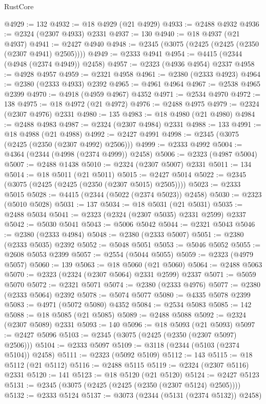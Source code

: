 \begin{lexlean}{RustCore}
\begin{coremodule}
@4929 := 132
@4932 := @18 @4929 (@21 @4929)
@4933 := @2488 @4932
@4936 := @2324 (@2307 @4933) @2331
@4937 := 130
@4940 := @18 @4937 (@21 @4937)
@4941 := @2427 @4940
@4948 := @2345 (@3075 (@2425 (@2425 (@2350 (@2307 @4941) @2505))))
@4949 := @2333 @4941
@4954 := @4415 (@2344 (@4948 (@2374 @4949)) @2458)
@4957 := @2323 (@4936 @4954) @2337
@4958 := @4928 @4957
@4959 := @2321 @4958
@4961 := @2380 (@2333 @4923)
@4964 := @2380 (@2333 @4933) @2392
@4965 := @4961 @4964
@4967 := @2538 @4965 @2399
@4970 := @4918 (@4959 @4967) @4352
@4971 := @2534 @4970
@4972 := 138
@4975 := @18 @4972 (@21 @4972)
@4976 := @2488 @4975
@4979 := @2324 (@2307 @4976) @2331
@4980 := 135
@4983 := @18 @4980 (@21 @4980)
@4984 := @2488 @4983
@4987 := @2324 (@2307 @4984) @2331
@4988 := 133
@4991 := @18 @4988 (@21 @4988)
@4992 := @2427 @4991
@4998 := @2345 (@3075 (@2425 (@2350 (@2307 @4992) @2506)))
@4999 := @2333 @4992
@5004 := @4364 (@2344 (@4998 (@2374 @4999)) @2458)
@5006 := @2323 (@4987 @5004)
@5007 := @2488 @1438
@5010 := @2324 (@2307 @5007) @2331
@5011 := 134
@5014 := @18 @5011 (@21 @5011)
@5015 := @2427 @5014
@5022 := @2345 (@3075 (@2425 (@2425 (@2350 (@2307 @5015) @2505))))
@5023 := @2333 @5015
@5028 := @4415 (@2344 (@5022 (@2374 @5023)) @2458)
@5030 := @2323 (@5010 @5028)
@5031 := 137
@5034 := @18 @5031 (@21 @5031)
@5035 := @2488 @5034
@5041 := @2323 (@2324 (@2307 @5035) @2331 @2599) @2337
@5042 := @5030 @5041
@5043 := @5006 @5042
@5044 := @2321 @5043
@5046 := @2380 (@2333 @4984)
@5048 := @2380 (@2333 @5007)
@5051 := @2380 (@2333 @5035) @2392
@5052 := @5048 @5051
@5053 := @5046 @5052
@5055 := @2608 @5053 @2399
@5057 := @2554 (@5044 @5055)
@5059 := @2323 (@4979 @5057)
@5060 := 139
@5063 := @18 @5060 (@21 @5060)
@5064 := @2488 @5063
@5070 := @2323 (@2324 (@2307 @5064) @2331 @2599) @2337
@5071 := @5059 @5070
@5072 := @2321 @5071
@5074 := @2380 (@2333 @4976)
@5077 := @2380 (@2333 @5064) @2392
@5078 := @5074 @5077
@5080 := @4335 @5078 @2399
@5083 := @4971 (@5072 @5080) @4352
@5084 := @2534 @5083
@5085 := 142
@5088 := @18 @5085 (@21 @5085)
@5089 := @2488 @5088
@5092 := @2324 (@2307 @5089) @2331
@5093 := 140
@5096 := @18 @5093 (@21 @5093)
@5097 := @2427 @5096
@5103 := @2345 (@3075 (@2425 (@2350 (@2307 @5097) @2506)))
@5104 := @2333 @5097
@5109 := @3118 (@2344 (@5103 (@2374 @5104)) @2458)
@5111 := @2323 (@5092 @5109)
@5112 := 143
@5115 := @18 @5112 (@21 @5112)
@5116 := @2488 @5115
@5119 := @2324 (@2307 @5116) @2331
@5120 := 141
@5123 := @18 @5120 (@21 @5120)
@5124 := @2427 @5123
@5131 := @2345 (@3075 (@2425 (@2425 (@2350 (@2307 @5124) @2505))))
@5132 := @2333 @5124
@5137 := @3073 (@2344 (@5131 (@2374 @5132)) @2458)

\end{coremodule}
\end{lexlean}
